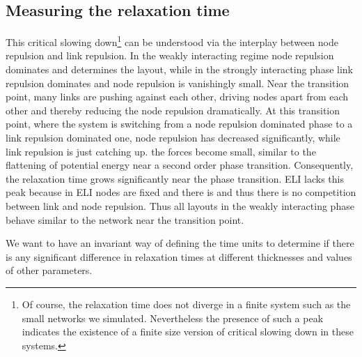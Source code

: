 \documentclass[nofootinbib,preprint,floatfix,titlepage,superscriptaddress]{revtex4} %
\newcommand{\outNim}[1]{}
\begin{document}
\outNim{
\subsection{FDL bad}
Even with a reasonably small link thickness, the plain FDL puts nodes too close to each other and makes linking them very cumbersome. Of course, modern algorithms based on FDL modify it in order to avoid such node crossings. 
Our E-ELM algorithm with purely short-range forces between nodes naturally includes the exclusion volume around nodes and avoids nodes overlaps. 
}


\subsection{Measuring the relaxation time}
This critical slowing down\footnote{Of course, the relaxation time does not diverge in a finite system such as the small networks we simulated. 
Nevertheless the presence of such a peak indicates the existence of a finite size version of critical slowing down in these systems.} 
can be understood via the interplay between node repulsion and link repulsion. 
In the weakly interacting regime node repulsion dominates and determines the layout, while in the strongly interacting phase link repulsion dominates and node repulsion is vanishingly small. 
Near the transition point, many links are pushing against each other, driving nodes apart from each other and thereby reducing the node repulsion dramatically. 
At this transition point, where the system is switching from a node repulsion dominated phase to a link repulsion dominated one, node repulsion has decreased significantly, while link repulsion is just catching up. the forces become small, similar to the flattening of potential energy near a second order phase transition.
Consequently, the relaxation time grows significantly near the phase transition. 
ELI lacks this peak %
because in ELI nodes are fixed and there is and thus there is no competition between link and node repulsion. 
Thus all layouts in the weakly interacting phase behave similar to the network near the transition point.  


We want to have an invariant way of defining the time units to determine if there is any significant difference in relaxation times at different thicknesses and values of other parameters. 
\end{document}
